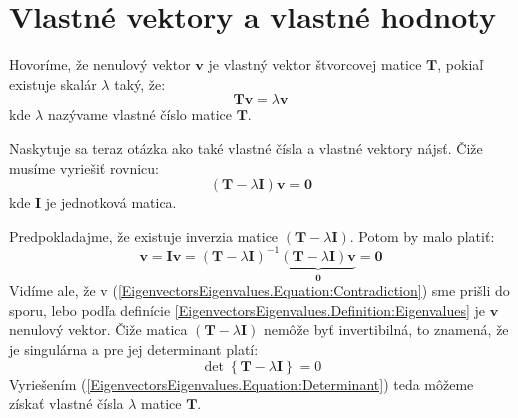 \documentclass[a4paper, 10pt, ]{article}
\begin{document}
\bigskip

\normalsize
\normalfont

\section{Vlastné vektory a vlastné hodnoty}
\label{EigenvectorsEigenvalues}

\begin{definition}
    \label{EigenvectorsEigenvalues.Definition:Eigenvalues}
    Hovoríme, že nenulový vektor $\bm{v}$ je vlastný vektor štvorcovej matice $\bm{T}$, pokiaľ existuje skalár $\lambda$ taký, že:
    \begin{equation}
        \bm{T} \bm{v} = \lambda \bm{v}
    \end{equation}
    kde $\lambda$ nazývame vlastné číslo matice $\bm{T}$.
\end{definition}

Naskytuje sa teraz otázka ako také vlastné čísla a vlastné vektory nájsť. Čiže musíme vyriešiť rovnicu:
\begin{equation}
    \label{EigenvectorsEigenvalues.Equation:EigenvaluesEquation}
    \left( \bm{T} - \lambda \bm{I} \right) \bm{v} = \bm{0}
\end{equation}
kde $\bm{I}$ je jednotková matica.

Predpokladajme, že existuje inverzia matice $\left( \bm{T} - \lambda \bm{I} \right)$. Potom by malo platiť:
\begin{equation}
    \label{EigenvectorsEigenvalues.Equation:Contradiction}
    \bm{v} = \bm{I} \bm{v} = 
    \left( \bm{T} - \lambda \bm{I} \right)^{-1} \underbrace{\left( \bm{T} - \lambda \bm{I} \right) \bm{v}}_{\bm{0}} = \bm{0}
\end{equation}
Vidíme ale, že v (\ref{EigenvectorsEigenvalues.Equation:Contradiction}) sme prišli do sporu, lebo podľa definície \ref{EigenvectorsEigenvalues.Definition:Eigenvalues} je $\bm{v}$ nenulový vektor. Čiže matica $\left( \bm{T} - \lambda \bm{I} \right)$ nemôže byť invertibilná, to znamená, že je singulárna a pre jej determinant platí:
\begin{equation}
    \label{EigenvectorsEigenvalues.Equation:Determinant}
    \det \left\{ \bm{T} - \lambda \bm{I} \right\} = 0
\end{equation}
Vyriešením (\ref{EigenvectorsEigenvalues.Equation:Determinant}) teda môžeme získať vlastné čísla $\lambda$ matice $\bm{T}$.
\end{document}
